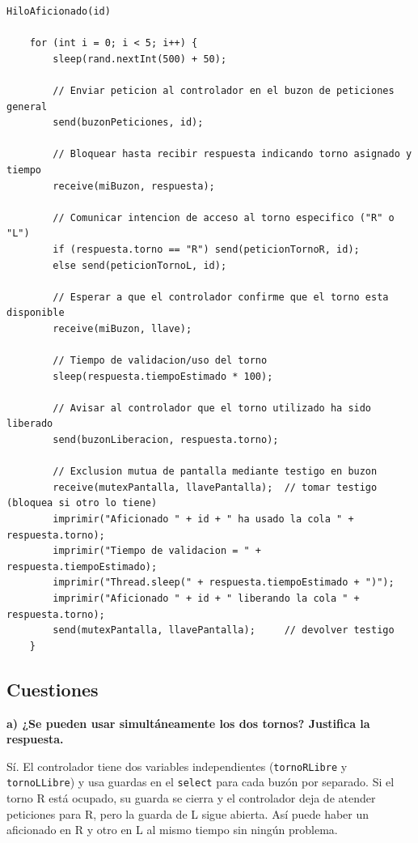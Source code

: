 \documentclass[12pt,a4paper]{article}
\begin{document}
\begin{lstlisting}[language={}, caption={Pseudocódigo HiloAficionado}]
HiloAficionado(id)

    for (int i = 0; i < 5; i++) {
        sleep(rand.nextInt(500) + 50);

        // Enviar peticion al controlador en el buzon de peticiones general
        send(buzonPeticiones, id);

        // Bloquear hasta recibir respuesta indicando torno asignado y tiempo
        receive(miBuzon, respuesta);

        // Comunicar intencion de acceso al torno especifico ("R" o "L")
        if (respuesta.torno == "R") send(peticionTornoR, id);
        else send(peticionTornoL, id);

        // Esperar a que el controlador confirme que el torno esta disponible
        receive(miBuzon, llave);

        // Tiempo de validacion/uso del torno
        sleep(respuesta.tiempoEstimado * 100);

        // Avisar al controlador que el torno utilizado ha sido liberado
        send(buzonLiberacion, respuesta.torno);

        // Exclusion mutua de pantalla mediante testigo en buzon
        receive(mutexPantalla, llavePantalla);  // tomar testigo (bloquea si otro lo tiene)
        imprimir("Aficionado " + id + " ha usado la cola " + respuesta.torno);
        imprimir("Tiempo de validacion = " + respuesta.tiempoEstimado);
        imprimir("Thread.sleep(" + respuesta.tiempoEstimado + ")");
        imprimir("Aficionado " + id + " liberando la cola " + respuesta.torno);
        send(mutexPantalla, llavePantalla);     // devolver testigo
    }
\end{lstlisting}

\subsection{Cuestiones}
\textbf{a) ¿Se pueden usar simultáneamente los dos tornos? Justifica la respuesta.}

Sí. El controlador tiene dos variables independientes (\texttt{tornoRLibre} y \texttt{tornoLLibre}) y usa guardas en el \texttt{select} para cada buzón por separado. Si el torno R está ocupado, su guarda se cierra y el controlador deja de atender peticiones para R, pero la guarda de L sigue abierta. Así puede haber un aficionado en R y otro en L al mismo tiempo sin ningún problema.
\end{document}
